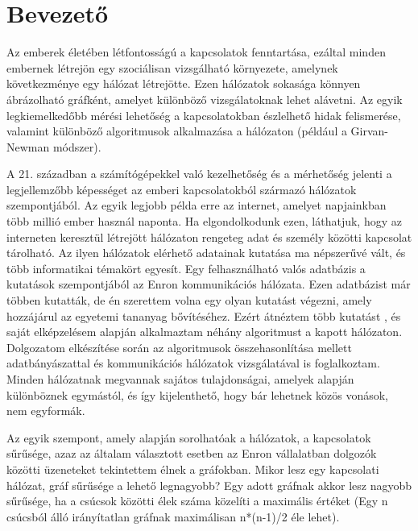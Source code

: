 \chapter{Bevezető}%

Az emberek életében létfontosságú a kapcsolatok fenntartása, ezáltal minden embernek létrejön egy szociálisan vizsgálható környezete, amelynek következménye egy hálózat létrejötte. Ezen hálózatok sokasága könnyen ábrázolható gráfként, amelyet különböző vizsgálatoknak lehet alávetni.
Az egyik legkiemelkedőbb mérési lehetőség a kapcsolatokban észlelhető hidak felismerése, valamint különböző algoritmusok alkalmazása a hálózaton (például a Girvan-Newman módszer).

A 21. században a számítógépekkel való kezelhetőség és a mérhetőség jelenti a legjellemzőbb képességet az emberi kapcsolatokból származó hálózatok szempontjából. Az egyik legjobb példa erre az internet, amelyet napjainkban több millió ember használ naponta. Ha elgondolkodunk ezen, láthatjuk, hogy az interneten keresztül létrejött hálózaton rengeteg adat és személy közötti kapcsolat tárolható. Az ilyen hálózatok elérhető adatainak kutatása ma népszerűvé vált, és több informatikai témakört egyesít.
Egy felhasználható valós adatbázis a kutatások szempontjából az Enron kommunikációs hálózata.\cite{Enron02}
Ezen adatbázist már többen kutatták, de én szerettem volna egy olyan kutatást végezni, amely hozzájárul az egyetemi tananyag bővítéséhez. Ezért átnéztem több kutatást \cite{Enron01}, és saját elképzelésem alapján alkalmaztam néhány algoritmust a kapott hálózaton.
Dolgozatom elkészítése során az algoritmusok összehasonlítása mellett adatbányászattal és kommunikációs hálózatok vizsgálatával is foglalkoztam. Minden hálózatnak megvannak sajátos tulajdonságai, amelyek alapján különböznek egymástól, és így kijelenthető, hogy bár lehetnek közös vonások, nem egyformák.

Az egyik szempont, amely alapján sorolhatóak a hálózatok, a kapcsolatok sűrűsége, azaz az általam választott esetben az Enron vállalatban dolgozók közötti üzeneteket tekintettem élnek a gráfokban. Mikor lesz egy kapcsolati hálózat, gráf sűrűsége a lehető legnagyobb? Egy adott gráfnak akkor lesz nagyobb sűrűsége, ha a csúcsok közötti élek száma közelíti a maximális értéket (Egy n csúcsból álló irányítatlan gráfnak maximálisan n*(n-1)/2 éle lehet).

